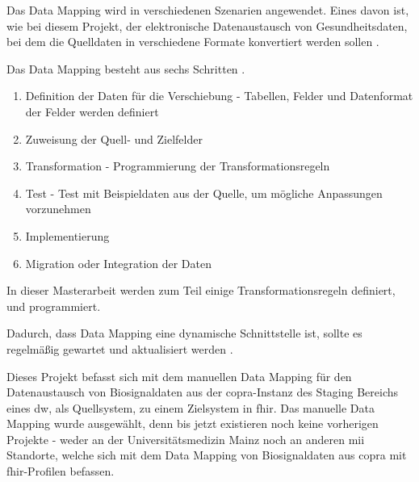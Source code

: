Das Data Mapping wird in verschiedenen Szenarien angewendet. Eines davon ist, wie bei diesem Projekt, der elektronische Datenaustausch von Gesundheitsdaten, bei dem die Quelldaten in verschiedene Formate konvertiert werden sollen \cite{datamappingastera}.

Das Data Mapping besteht aus sechs Schritten \cite{datamappingtalend}. 
\begin{enumerate}
  \item Definition der Daten für die Verschiebung - Tabellen, Felder und Datenformat der Felder werden definiert
  \item Zuweisung der Quell- und Zielfelder
  \item Transformation - Programmierung der Transformationsregeln
  \item Test - Test mit Beispieldaten aus der Quelle, um mögliche Anpassungen vorzunehmen
  \item Implementierung 
  \item Migration oder Integration der Daten
\end{enumerate}

In dieser Masterarbeit werden zum Teil einige Transformationsregeln definiert, und programmiert.

Dadurch, dass Data Mapping eine dynamische Schnittstelle ist, sollte es regelmäßig gewartet und aktualisiert werden \cite{datamappingtalend}.

Dieses Projekt befasst sich mit dem manuellen Data Mapping für den Datenaustausch von Biosignaldaten aus der \ac{copra}-Instanz des Staging Bereichs eines \ac{dw}, als Quellsystem, zu einem Zielsystem in \ac{fhir}. Das manuelle Data Mapping wurde ausgewählt, denn bis jetzt existieren noch keine vorherigen Projekte - weder an der Universitätsmedizin Mainz noch an anderen \ac{mii} Standorte, welche sich mit dem Data Mapping von Biosignaldaten aus \ac{copra} mit \ac{fhir}-Profilen befassen.